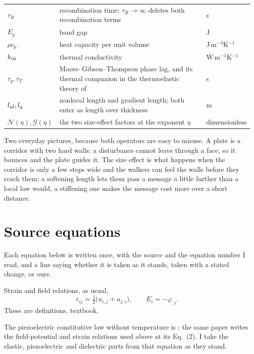 \documentclass[11pt]{article}
\newcommand{\Ncal}{\mathcal{N}}
\newcommand{\Gcal}{\mathcal{G}}
\begin{document}
\begin{center}
\begin{tabular}{p{2.1cm}p{7.6cm}p{4.3cm}}
$\tau_R$ & recombination time; $\tau_R\to\infty$ deletes both recombination terms & s\\
$E_g$ & band gap & J\\
$\rho c_p$ & heat capacity per unit volume & J\,m$^{-3}$K$^{-1}$\\
$k_{\rm th}$ & thermal conductivity & W\,m$^{-1}$K$^{-1}$\\
$\tau_q,\tau_T$ & Moore--Gibson--Thompson phase lag, and its thermal companion in the thermoelastic theory of \cite{Quintanilla2019} & s\\
$l_{\rm nl},l_g$ & nonlocal length and gradient length; both enter as length over thickness & m\\
$\Ncal(\eta),\Gcal(\eta)$ & the two size-effect factors at the exponent $\eta$ & dimensionless\\
\bottomrule
\end{tabular}
\end{center}

Two everyday pictures, because both operators are easy to misuse. A plate is a corridor with two hard
walls: a disturbance cannot leave through a face, so it bounces and the plate guides it. The size effect is
what happens when the corridor is only a few steps wide and the walkers can feel the walls before they
reach them; a softening length lets them pass a message a little further than a local law would, a
stiffening one makes the message cost more over a short distance.

\section{Source equations}\label{sec:source}

Each equation below is written once, with the source and the equation number I read, and a line saying
whether it is taken as it stands, taken with a stated change, or ours.

Strain and field relations, as usual,
\begin{equation}
\varepsilon_{ij}=\tfrac12\bigl(u_{i,j}+u_{j,i}\bigr),\qquad E_i=-\varphi_{,i}.
\label{eq:kin}
\end{equation}
These are definitions, textbook.

The piezoelectric constitutive law without temperature is \cite[Eq.~(1)]{Zhu2023}; the same paper writes
the field-potential and strain relations used above at its Eq.~(2). I take the elastic, piezoelectric and
dielectric parts from that equation as they stand.
\end{document}
